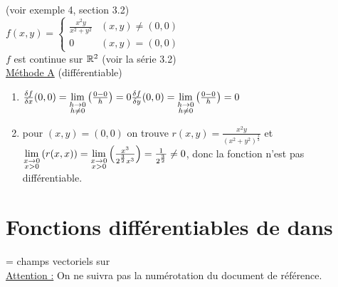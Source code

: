 \documentclass[12pt,a4paper]{article}
\begin{document}
\noindent{}\\
(voir exemple 4, section 3.2)\\
$f(x,y) = \left\{\begin{array}{ll}
	\frac{x^2y}{x^2+y^2} & (x,y) \neq (0,0)\\
	0 & (x,y) = (0,0)
\end{array}\right.$\\
$f$ est continue sur $\mathbb{R}^2$ (voir la série 3.2)\\
\underline{Méthode A} (différentiable)
\begin{enumerate}[label=\roman*)]
	\item 	$\frac{\delta f}{\delta x}(0,0) = \lim\limits_{\substack{h\to 0 \\ h\neq 0}}\left(\frac{0-0}{h}\right) = 0\\
			\frac{\delta f}{\delta y}(0,0) = \lim\limits_{\substack{h\to 0 \\ h\neq 0}}\left(\frac{0-0}{h}\right) = 0$
	\item pour $(x,y) = (0,0)$ on trouve $r(x,y) = \frac{x^2y}{(x^2+y^2)^{\frac{3}{2}}}$ et $\lim\limits_{\substack{x\to 0 \\ x > 0}}\left(r(x,x)\right) = \lim\limits_{\substack{x\to 0 \\ x>0}}\left(\frac{x^3}{2^{\frac{3}{2}}x^3}\right) = \frac{1}{2^{\frac{3}{2}}} \neq 0$, donc la fonction n'est pas différentiable.
\end{enumerate}

\section[Fonction diff $\rn \to \Rm$]{Fonctions différentiables de \rn dans \Rm}
\setcounter{equation}{0}
= champs vectoriels sur \rn\\
\underline{Attention :} On ne suivra pas la numérotation du document de référence.
\end{document}
